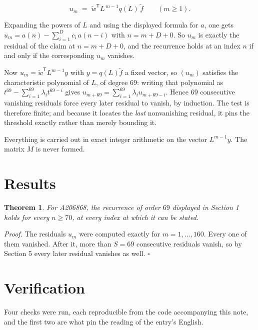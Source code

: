 \documentclass[11pt]{article}
\newtheorem{theorem}{Theorem}
\theoremstyle{definition}
\begin{document}
\[u_m \;=\; \tilde w^{\mathsf T} L^{\,m-1} q(L)\,\tilde f \qquad (m \ge 1).\]

Expanding the powers of $L$ and using the displayed formula for $a$, one gets $u_m = a(n) - \sum_{i=1}^{D} c_i\,a(n-i)$ with $n = m + D + 0$. So $u_m$ is exactly the residual of the claim at $n = m + D + 0$, and the recurrence holds at an index $n$ if and only if the corresponding $u_m$ vanishes.

Now $u_m = \tilde w^{\mathsf T} L^{m-1} y$ with $y = q(L)\tilde f$ a fixed vector, so $(u_m)$ satisfies the characteristic polynomial of $L$, of degree $69$: writing that polynomial as $t^{69} - \sum_{i=1}^{69} \lambda_i t^{69-i}$ gives $u_{m+69} = \sum_{i=1}^{69} \lambda_i u_{m+69-i}$. Hence $69$ consecutive vanishing residuals force every later residual to vanish, by induction. The test is therefore finite; and because it locates the {\itshape last} nonvanishing residual, it pins the threshold exactly rather than merely bounding it.

Everything is carried out in exact integer arithmetic on the vector $L^{m-1}y$. The matrix $M$ is never formed.

\section{Results}

\begin{theorem} For A206868, the recurrence of order $69$ displayed in Section 1 holds for every $n \ge 70$, at every index at which it can be stated.\end{theorem}

{\itshape Proof.} The residuals $u_m$ were computed exactly for $m = 1,\dots,160$. Every one of them vanished. After it, more than $S = 69$ consecutive residuals vanish, so by Section 5 every later residual vanishes as well. $\square$

\section{Verification}

Four checks were run, each reproducible from the code accompanying this note, and the first two are what pin the reading of the entry's English.
\end{document}
